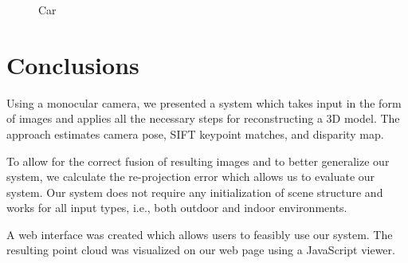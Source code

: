 \documentclass[11pt, a4paper, openany]{article}
\begin{document}
\begin{figure}[H]%
    \centering
    \qquad
    \qquad
    \qquad
    \caption{Car}%
    \label{fig:car}%
\end{figure}
\section{Conclusions}
Using a monocular camera, we presented a system which takes input in the form of images and applies all the necessary steps for reconstructing a 3D model. The approach estimates camera pose, SIFT keypoint matches, and disparity map.

To allow for the correct fusion of resulting images and to better generalize our system, we calculate the re-projection error which allows us to evaluate our system. Our system does not require any initialization of scene structure and works for all input types, i.e., both outdoor and indoor environments.

A web interface was created which allows users to feasibly use our system. The resulting point cloud was visualized on our web page using a JavaScript viewer.

\newpage
\end{document}
